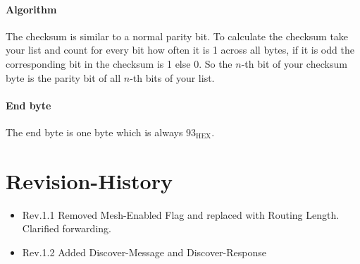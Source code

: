 \documentclass{scrreprt}
\begin{document}
\subsubsection{Algorithm}
The checksum is similar to a normal parity bit. To calculate the checksum
take your list and count for every bit how often it is 1 across all bytes,
if it is odd the corresponding bit in the checksum is 1 else 0.
So the $n$-th bit of your checksum byte is the parity bit of all $n$-th
bits of your list.

\subsubsection{End byte}
The end byte is one byte which is always $93_\text{HEX}$.

\pagebreak
\chapter{Revision-History}
\begin{itemize}
  \item Rev.1.1 Removed Mesh-Enabled Flag and replaced with Routing Length. Clarified forwarding.
  \item Rev.1.2 Added Discover-Message and Discover-Response
\end{itemize}
\end{document}
